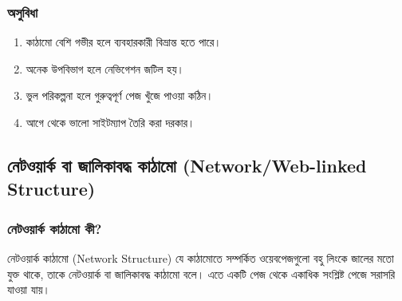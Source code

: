 \begin{minipage}[t]{.48\linewidth}\vspace{0pt}
\subsubsection{অসুবিধা}
\begin{enumerate}
\item কাঠামো বেশি গভীর হলে ব্যবহারকারী বিভ্রান্ত হতে পারে।
\item অনেক উপবিভাগ হলে নেভিগেশন জটিল হয়।
\item ভুল পরিকল্পনা হলে গুরুত্বপূর্ণ পেজ খুঁজে পাওয়া কঠিন।
\item আগে থেকে ভালো সাইটম্যাপ তৈরি করা দরকার।
\end{enumerate}
\end{minipage}\par

\subsection{নেটওয়ার্ক বা জালিকাবদ্ধ কাঠামো (Network/Web-linked Structure)}

\subsubsection{নেটওয়ার্ক কাঠামো কী?}

\begin{definitionbox}{নেটওয়ার্ক কাঠামো (Network Structure)}
যে কাঠামোতে সম্পর্কিত ওয়েবপেজগুলো বহু লিংকে জালের মতো যুক্ত থাকে, তাকে নেটওয়ার্ক বা জালিকাবদ্ধ কাঠামো বলে। এতে একটি পেজ থেকে একাধিক সংশ্লিষ্ট পেজে সরাসরি যাওয়া যায়।
\end{definitionbox}

\begin{center}
\end{center}

